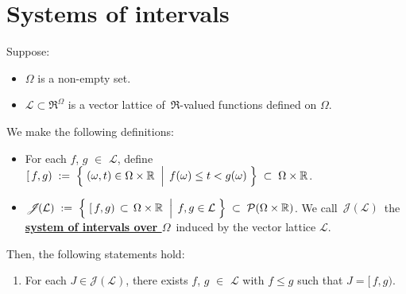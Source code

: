 

\section{Systems of intervals}
\setcounter{theorem}{0}
\setcounter{equation}{0}


\renewcommand{\theenumi}{\roman{enumi}}
\renewcommand{\labelenumi}{\textnormal{(\theenumi)}$\;\;$}


\begin{lemma}
\mbox{}\vskip 0.1cm
\noindent
Suppose:
\begin{itemize}
\item
	$\Omega$ is a non-empty set.
\item
	$\mathcal{L} \subset \Re^{\Omega}$ is a vector lattice of \,$\Re$-valued functions defined on $\Omega$.
\end{itemize}
We make the following definitions:
\begin{itemize}
\item
	For each $f$, $g$ $\in$ $\mathcal{L}$, define
	\,$[\,f,g)
	\; := \;
		\left\{\,
		\left.
		(\omega,t) \overset{{\color{white}.}}{\in} \Omega \times \Re
		\;\;\right\vert\;
		f(\omega) \leq t < g(\omega)
		\;\right\}
	\; \subset \;
		\Omega \times \Re$.
\item
	$\mathscr{J}\!(\mathcal{L})
	\; := \;
		\left\{\,
		\left.
		[\,f,g) \,\overset{{\color{white}.}}{\subset}\, \Omega \times \Re
		\;\;\right\vert\;
		f,g \in \mathcal{L}
		\;\right\}
	\; \subset \;
		\mathcal{P}\!\left(\Omega \times \Re\right)$.
	\vskip 0.05cm
	We call \,$\mathscr{J}\!(\mathcal{L})$\, the \,\underline{\textbf{system of intervals over $\Omega$}}\,
	induced by the vector lattice $\mathcal{L}$.
\end{itemize}
Then, the following statements hold:
\begin{enumerate}
\item
	For each $J \in \mathscr{J}\!(\mathcal{L})$,
	there exists $f$, $g$ $\in$ $\mathcal{L}$ with $f \leq g$ such that $J = [\,f,g)$.

\end{enumerate}
\end{lemma}
